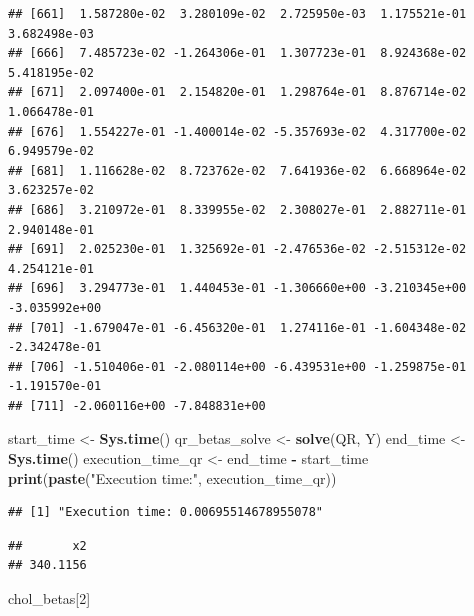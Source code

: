 \documentclass[
]{article}
\newenvironment{Shaded}{\begin{snugshade}}{\end{snugshade}}
\newcommand{\CommentTok}[1]{\textcolor[rgb]{0.56,0.35,0.01}{\textit{#1}}}
\newcommand{\DecValTok}[1]{\textcolor[rgb]{0.00,0.00,0.81}{#1}}
\newcommand{\FunctionTok}[1]{\textcolor[rgb]{0.13,0.29,0.53}{\textbf{#1}}}
\newcommand{\NormalTok}[1]{#1}
\newcommand{\OtherTok}[1]{\textcolor[rgb]{0.56,0.35,0.01}{#1}}
\newcommand{\SpecialCharTok}[1]{\textcolor[rgb]{0.81,0.36,0.00}{\textbf{#1}}}
\newcommand{\StringTok}[1]{\textcolor[rgb]{0.31,0.60,0.02}{#1}}
\begin{document}
\begin{verbatim}
## [661]  1.587280e-02  3.280109e-02  2.725950e-03  1.175521e-01  3.682498e-03
## [666]  7.485723e-02 -1.264306e-01  1.307723e-01  8.924368e-02  5.418195e-02
## [671]  2.097400e-01  2.154820e-01  1.298764e-01  8.876714e-02  1.066478e-01
## [676]  1.554227e-01 -1.400014e-02 -5.357693e-02  4.317700e-02  6.949579e-02
## [681]  1.116628e-02  8.723762e-02  7.641936e-02  6.668964e-02  3.623257e-02
## [686]  3.210972e-01  8.339955e-02  2.308027e-01  2.882711e-01  2.940148e-01
## [691]  2.025230e-01  1.325692e-01 -2.476536e-02 -2.515312e-02  4.254121e-01
## [696]  3.294773e-01  1.440453e-01 -1.306660e+00 -3.210345e+00 -3.035992e+00
## [701] -1.679047e-01 -6.456320e-01  1.274116e-01 -1.604348e-02 -2.342478e-01
## [706] -1.510406e-01 -2.080114e+00 -6.439531e+00 -1.259875e-01 -1.191570e-01
## [711] -2.060116e+00 -7.848831e+00
\end{verbatim}

\begin{Shaded}
\begin{Highlighting}[]
\NormalTok{start\_time }\OtherTok{\textless{}{-}} \FunctionTok{Sys.time}\NormalTok{()}
\NormalTok{qr\_betas\_solve }\OtherTok{\textless{}{-}} \FunctionTok{solve}\NormalTok{(QR, Y)}
\NormalTok{end\_time }\OtherTok{\textless{}{-}} \FunctionTok{Sys.time}\NormalTok{()}
\NormalTok{execution\_time\_qr }\OtherTok{\textless{}{-}}\NormalTok{ end\_time }\SpecialCharTok{{-}}\NormalTok{ start\_time}
\FunctionTok{print}\NormalTok{(}\FunctionTok{paste}\NormalTok{(}\StringTok{"Execution time:"}\NormalTok{, execution\_time\_qr))}
\end{Highlighting}
\end{Shaded}

\begin{verbatim}
## [1] "Execution time: 0.00695514678955078"
\end{verbatim}

\begin{Shaded}
\end{Shaded}

\begin{verbatim}
##       x2 
## 340.1156
\end{verbatim}

\begin{Shaded}
\begin{Highlighting}[]
\NormalTok{chol\_betas[}\DecValTok{2}\NormalTok{]}
\end{Highlighting}
\end{Shaded}
\end{document}

